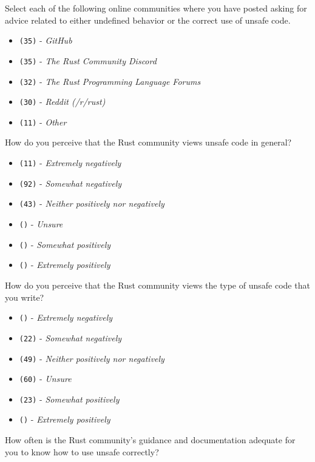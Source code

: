 \begin{protocol}
\item \label{survey:ccq1}  Select each of the following online communities where you have posted asking for advice related to either undefined behavior or the correct use of unsafe code.
\begin{itemize}
\item \texttt{(35)} - \textit{GitHub}
\item \texttt{(35)} - \textit{The Rust Community Discord}
\item \texttt{(32)} - \textit{The Rust Programming Language Forums}
\item \texttt{(30)} - \textit{Reddit (/r/rust)}
\item \texttt{(11)} - \textit{Other}
\end{itemize}
\item \label{survey:ccq2}  How do you perceive that the Rust community views unsafe code in general?
\begin{itemize}
\item \texttt{(11)} - \textit{Extremely negatively}
\item \texttt{(92)} - \textit{Somewhat negatively}
\item \texttt{(43)} - \textit{Neither positively nor negatively}
\item \texttt{()} - \textit{Unsure}
\item \texttt{()} - \textit{Somewhat positively}
\item \texttt{()} - \textit{Extremely positively}
\end{itemize}
\item \label{survey:ccq3}  How do you perceive that the Rust community views the type of unsafe code that you write?
\begin{itemize}
\item \texttt{()} - \textit{Extremely negatively}
\item \texttt{(22)} - \textit{Somewhat negatively}
\item \texttt{(49)} - \textit{Neither positively nor negatively}
\item \texttt{(60)} - \textit{Unsure}
\item \texttt{(23)} - \textit{Somewhat positively}
\item \texttt{()} - \textit{Extremely positively}
\end{itemize}
\item \label{survey:ccq4}  How often is the Rust community’s guidance and documentation adequate for you to know how to use unsafe correctly?

\end{protocol}
